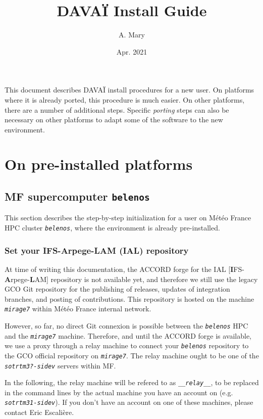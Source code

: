 \documentclass[a4paper,10pt,twoside]{article}
\title{DAVAÏ Install Guide}
\author{A. Mary}
\date{Apr. 2021}
\begin{document}
\maketitle

This document describes DAVAÏ install procedures for a new user. On platforms where it is already ported, this procedure is much easier. On other platforms, there are a number of additional steps. 
Specific \textit{porting} steps can also be necessary on other platforms to adapt some of the software to the new environment.

\tableofcontents
\vspace{1cm}
\newpage






\section{On pre-installed platforms}

\subsection{MF supercomputer \texttt{belenos}}
This section describes the step-by-step initialization for a user on Météo France HPC cluster \texttt{\textit{belenos}}, where the environment is already pre-installed.

\subsubsection{Set your IFS-Arpege-LAM (IAL) repository}
At time of writing this documentation, the ACCORD forge for the IAL [\textbf{I}FS-\textbf{A}rpege-\textbf{L}AM] repository is not available yet, and therefore we still use the legacy GCO Git repository for the publishing of releases, updates of integration branches, and posting of contributions.
This repository is hosted on the machine \textit{\texttt{mirage7}} within Météo France internal network.

However, so far, no direct Git connexion is possible between the \textit{\texttt{belenos}} HPC and the \textit{\texttt{mirage7}} machine.
Therefore, and until the ACCORD forge is available, we use a proxy through a relay machine to connect your \textit{\texttt{belenos}} repository to the GCO official repository on \textit{\texttt{mirage7}}.
The relay machine ought to be one of the \texttt{\textit{sotrtm3?-sidev}} servers within MF.

In the following, the relay machine will be refered to as \texttt{\textit{\_\_relay\_\_}}, to be replaced in the command lines by the actual machine you have an account on (e.g. \textit{\texttt{sotrtm31-sidev}}). If you don't have an account on one of these machines, please contact Eric Escalière.\\
\end{document}
